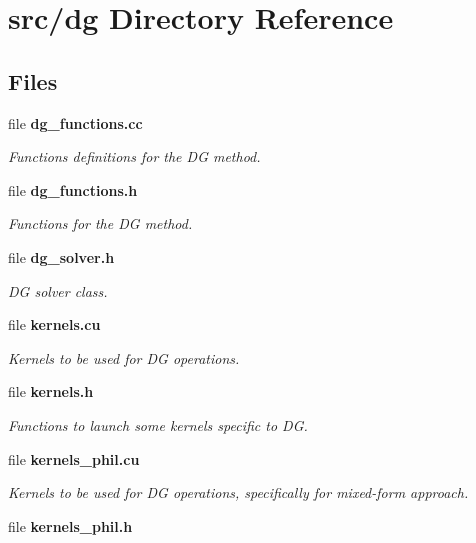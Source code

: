 \section{src/dg Directory Reference}
\label{dir_7a8b3e102d5cd39e192fdcbc8e888798}
\subsection*{Files}
\begin{DoxyCompactItemize}
\item 
file {\bf dg\-\_\-functions.\-cc}
\begin{DoxyCompactList}\small\item\em Functions definitions for the D\-G method. \end{DoxyCompactList}\item 
file {\bf dg\-\_\-functions.\-h}
\begin{DoxyCompactList}\small\item\em Functions for the D\-G method. \end{DoxyCompactList}\item 
file {\bf dg\-\_\-solver.\-h}
\begin{DoxyCompactList}\small\item\em D\-G solver class. \end{DoxyCompactList}\item 
file {\bf kernels.\-cu}
\begin{DoxyCompactList}\small\item\em Kernels to be used for D\-G operations. \end{DoxyCompactList}\item 
file {\bf kernels.\-h}
\begin{DoxyCompactList}\small\item\em Functions to launch some kernels specific to D\-G. \end{DoxyCompactList}\item 
file {\bf kernels\-\_\-phil.\-cu}
\begin{DoxyCompactList}\small\item\em Kernels to be used for D\-G operations, specifically for mixed-\/form approach. \end{DoxyCompactList}\item 
file {\bfseries kernels\-\_\-phil.\-h}
\end{DoxyCompactItemize}
